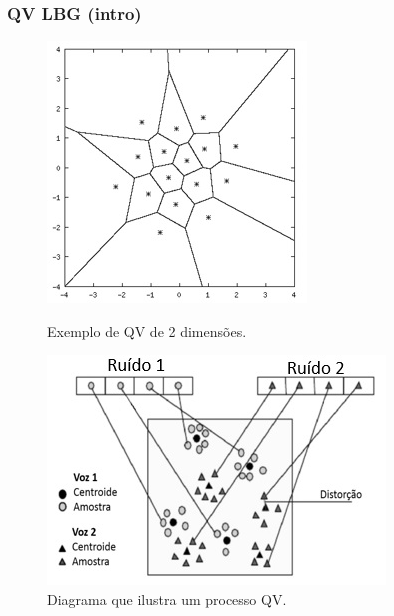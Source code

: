 \documentclass{beamer}
\begin{document}
\begin{frame}

	\frametitle{QV LBG (intro)}
	
	\begin{figure}
		\centering
		\begin{minipage}{.5\textwidth}
			\centering
		  	\includegraphics[width=.7\linewidth]{qvlbg01.jpg}
  			\caption{Exemplo de QV de 2 dimensões.}
  			\label{fig:qvlbg1}
		\end{minipage}%
		\begin{minipage}{.5\textwidth}
  			\centering
  			\includegraphics[width=\linewidth]{qvlbg02.jpg}
  			\caption{Diagrama que ilustra um processo QV.}
  			\label{fig:qvlbg1}
		\end{minipage}
	\end{figure}
	
\end{frame}
\end{document}
